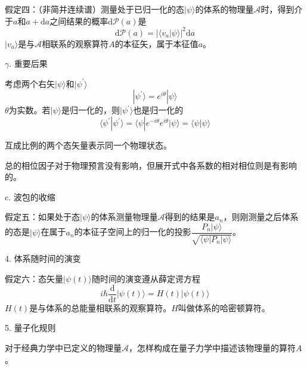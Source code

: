 \documentclass[11pt,a4paper]{article}
\newcommand{\dif}{\mathrm{d}}
\begin{document}
\begin{tcolorbox}[colback=green!15,colframe=green!40!black,title= ]
假定四：（非简并连续谱）测量处于已归一化的态$|\psi \rangle$的体系的物理量$\mathscr{A}$时，得到介于$a$和$a +\dif a$之间结果的概率$\dif \mathscr{P}(a)$是
\begin{equation*}
\dif \mathscr{P}(a) = |\langle v_a|\psi \rangle|^2 \dif a
\end{equation*}
$|v_a \rangle$是与$\mathscr{A}$相联系的观察算符$A$的本征矢，属于本征值$a$。
\end{tcolorbox}


$\gamma$. 重要后果

考虑两个右矢$|\psi \rangle$和$|\psi^\prime \rangle$
\begin{equation}
|\psi^\prime \rangle = e^{i\theta} |\psi \rangle
\end{equation}
$\theta$为实数。若$|\psi \rangle$是归一化的，则$|\psi^\prime \rangle$也是归一化的
\begin{equation}
\langle \psi^\prime |\psi^\prime \rangle = \langle \psi | e^{-i\theta} e^{i\theta}| \psi \rangle = \langle \psi | \psi \rangle
\end{equation}


互成比例的两个态矢量表示同一个物理状态。



总的相位因子对于物理预言没有影响，但展开式中各系数的相对相位则是有影响的。

c. 波包的收缩


\begin{tcolorbox}[colback=green!15,colframe=green!40!black,title= ]
假定五：如果处于态$|\psi \rangle$的体系测量物理量$\mathscr{A}$得到的结果是$a_n$，则刚测量之后体系的态是$|\psi \rangle$在属于$a_n$的本征子空间上的归一化的投影$\dfrac{P_n|\psi \rangle}{\sqrt{\langle \psi|P_n|\psi \rangle}}$。
\end{tcolorbox}


4. 体系随时间的演变
\begin{tcolorbox}[colback=green!15,colframe=green!40!black,title= ]
假定六：态矢量$|\psi(t) \rangle$随时间的演变遵从薛定谔方程
\begin{equation*}
i\hbar \dfrac{\dif }{\dif t} |\psi(t) \rangle = H(t) |\psi(t) \rangle
\end{equation*}
$H(t)$是与体系的总能量相联系的观察算符。$H$叫做体系的哈密顿算符。
\end{tcolorbox}

5. 量子化规则

对于经典力学中已定义的物理量$\mathscr{A}$，怎样构成在量子力学中描述该物理量的算符$A$。
\end{document}
